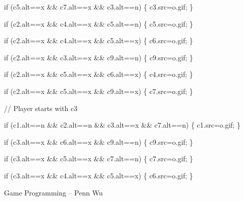 \documentclass[
]{article}
\begin{document}
if (c5.alt==\textquotesingle x\textquotesingle{} \&\&
c7.alt==\textquotesingle x\textquotesingle{} \&\&
c3.alt==\textquotesingle n\textquotesingle) \{
c3.src=\textquotesingle o.gif\textquotesingle; \}

if (c2.alt==\textquotesingle x\textquotesingle{} \&\&
c4.alt==\textquotesingle x\textquotesingle{} \&\&
c5.alt==\textquotesingle n\textquotesingle) \{
c5.src=\textquotesingle o.gif\textquotesingle; \}

if (c2.alt==\textquotesingle x\textquotesingle{} \&\&
c4.alt==\textquotesingle x\textquotesingle{} \&\&
c5.alt==\textquotesingle x\textquotesingle) \{
c6.src=\textquotesingle o.gif\textquotesingle; \}

if (c2.alt==\textquotesingle x\textquotesingle{} \&\&
c3.alt==\textquotesingle x\textquotesingle{} \&\&
c9.alt==\textquotesingle n\textquotesingle) \{
c9.src=\textquotesingle o.gif\textquotesingle; \}

if (c2.alt==\textquotesingle x\textquotesingle{} \&\&
c5.alt==\textquotesingle x\textquotesingle{} \&\&
c6.alt==\textquotesingle x\textquotesingle) \{
c4.src=\textquotesingle o.gif\textquotesingle; \}

if (c2.alt==\textquotesingle x\textquotesingle{} \&\&
c5.alt==\textquotesingle x\textquotesingle{} \&\&
c9.alt==\textquotesingle x\textquotesingle) \{
c7.src=\textquotesingle o.gif\textquotesingle; \}

// Player starts with c3

if (c1.alt==\textquotesingle n\textquotesingle{} \&\&
c2.alt==\textquotesingle n\textquotesingle{} \&\&
c3.alt==\textquotesingle x\textquotesingle{} \&\&
c7.alt==\textquotesingle n\textquotesingle) \{
c1.src=\textquotesingle o.gif\textquotesingle; \}

if (c3.alt==\textquotesingle x\textquotesingle{} \&\&
c6.alt==\textquotesingle x\textquotesingle{} \&\&
c9.alt==\textquotesingle n\textquotesingle) \{
c9.src=\textquotesingle o.gif\textquotesingle; \}

if (c3.alt==\textquotesingle x\textquotesingle{} \&\&
c5.alt==\textquotesingle x\textquotesingle{} \&\&
c7.alt==\textquotesingle n\textquotesingle) \{
c7.src=\textquotesingle o.gif\textquotesingle; \}

if (c3.alt==\textquotesingle x\textquotesingle{} \&\&
c4.alt==\textquotesingle x\textquotesingle{} \&\&
c5.alt==\textquotesingle x\textquotesingle) \{
c6.src=\textquotesingle o.gif\textquotesingle; \}

Game Programming -- Penn Wu
\end{document}
